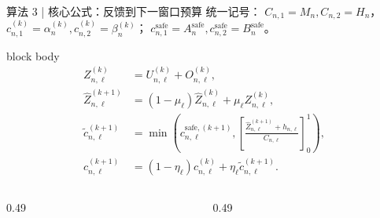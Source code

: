 \begin{frame}{算法 3 | 核心公式：反馈到下一窗口预算}
  \scriptsize
  统一记号：
  $C_{n,1}=M_n,C_{n,2}=H_n$，
  $c_{n,1}^{(k)}=\alpha_n^{(k)},c_{n,2}^{(k)}=\beta_n^{(k)}$；
  $c_{n,1}^{\mathrm{safe}}=A_n^{\mathrm{safe}},
  c_{n,2}^{\mathrm{safe}}=B_n^{\mathrm{safe}}$。

  \vspace{0.03cm}
  \begin{beamercolorbox}[rounded=true,sep=0.55ex,wd=\textwidth]{block body}
    \footnotesize
    \begin{align*}
      Z_{n,\ell}^{(k)}
        &=U_{n,\ell}^{(k)}+O_{n,\ell}^{(k)},\\
      \widehat Z_{n,\ell}^{(k+1)}
        &=(1-\mu_\ell)\widehat Z_{n,\ell}^{(k)}
          +\mu_\ell Z_{n,\ell}^{(k)},\\
      \widetilde c_{n,\ell}^{(k+1)}
        &=\min\!\left(
          c_{n,\ell}^{\mathrm{safe},(k+1)},
          \left[\frac{\widehat Z_{n,\ell}^{(k+1)}+h_{n,\ell}}
                     {C_{n,\ell}}\right]_0^1
        \right),\\
      c_{n,\ell}^{(k+1)}
        &=(1-\eta_\ell)c_{n,\ell}^{(k)}
          +\eta_\ell\widetilde c_{n,\ell}^{(k+1)}.
    \end{align*}
  \end{beamercolorbox}

  \vspace{0.04cm}
  \begin{columns}[T,onlytextwidth]
    \begin{column}{0.49\textwidth}
      \vspace{0.03cm}
    \end{column}
    \begin{column}{0.49\textwidth}
      \vspace{0.03cm}
    \end{column}
  \end{columns}
\end{frame}

